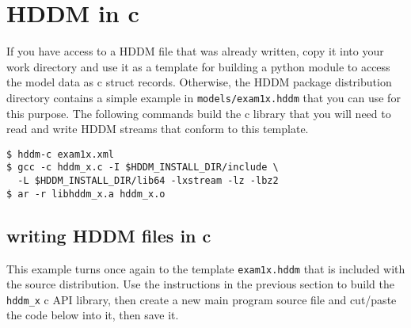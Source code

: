 \documentclass{revtex4}
\begin{document}
\section{HDDM in c}

If you have access to a HDDM file that was already written, copy it into your
work directory and use it as a template for building a python module to access
the model data as c struct records. Otherwise, the HDDM package distribution directory
contains a simple example in \texttt{models/exam1x.hddm} that you can use for
this purpose. The following commands build the c library that you will need
to read and write HDDM streams that conform to this template.

\vspace{0.5cm}
\begin{minipage}{12cm}
\begin{verbatim}
$ hddm-c exam1x.xml
$ gcc -c hddm_x.c -I $HDDM_INSTALL_DIR/include \
  -L $HDDM_INSTALL_DIR/lib64 -lxstream -lz -lbz2
$ ar -r libhddm_x.a hddm_x.o
\end{verbatim}
\end{minipage}
\vspace{0.5cm}

\subsection{writing HDDM files in c}

This example turns once again to the template \texttt{exam1x.hddm} that is included
with the source distribution. Use the instructions in the previous section to build
the \texttt{hddm\_x} c API library, then create a new main program source file and
cut/paste the code below into it, then save it.
\end{document}
